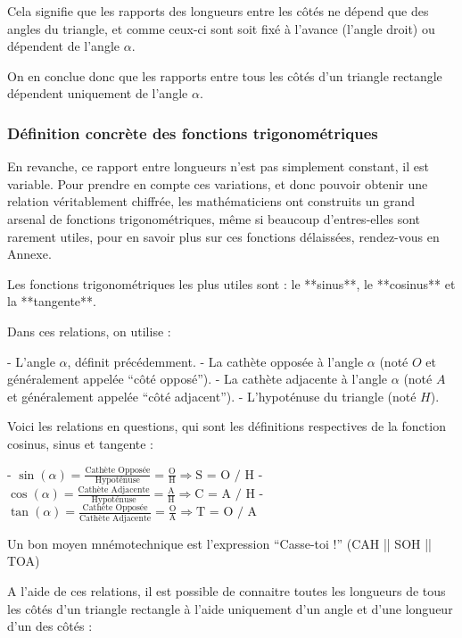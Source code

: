\documentclass[a4paper]{article}
\begin{document}
			Cela signifie que les rapports des longueurs entre les côtés ne dépend que des angles du triangle, et comme ceux-ci sont soit fixé à l'avance (l'angle droit) ou dépendent de l'angle $\alpha$. 

			On en conclue donc que les rapports entre tous les côtés d'un triangle rectangle dépendent uniquement de l'angle $\alpha$.

		\subsubsection{Définition concrète des fonctions trigonométriques}

			En revanche, ce rapport entre longueurs n'est pas simplement constant, il est variable. Pour prendre en compte ces variations, et donc pouvoir obtenir une relation véritablement chiffrée, les mathématiciens ont construits un grand arsenal de fonctions trigonométriques, même si beaucoup d'entres-elles sont rarement utiles, pour en savoir plus sur ces fonctions délaissées, rendez-vous en Annexe.

			Les fonctions trigonométriques les plus utiles sont : le **sinus**, le **cosinus** et la **tangente**.

			Dans ces relations, on utilise : 

			- L'angle $\alpha$, définit précédemment.
			- La cathète opposée à l'angle $\alpha$ (noté $O$ et généralement appelée “côté opposé”).
			- La cathète adjacente à l'angle $\alpha$ (noté $A$ et généralement appelée “côté adjacent”).
			- L'hypoténuse du triangle (noté $H$).

			Voici les relations en questions, qui sont les définitions respectives de la fonction cosinus, sinus et tangente :

			- $\sin(\alpha) = \frac{\text{Cathète Opposée}}{\text{Hypoténuse}} = \frac{\text{O}}{\text{H}} \Longrightarrow \text{S = O / H} $
			- $\cos(\alpha) = \frac{\text{Cathète Adjacente}}{\text{Hypoténuse}} = \frac{\text{A}}{\text{H}} \Longrightarrow \text{C = A / H} $
			- $\tan(\alpha) = \frac{\text{Cathète Opposée}}{\text{Cathète Adjacente}} = \frac{\text{O}}{\text{A}} \Longrightarrow \text{T = O / A} $

			Un bon moyen mnémotechnique est l'expression “Casse-toi !” (CAH || SOH || TOA)

			A l'aide de ces relations, il est possible de connaitre toutes les longueurs de tous les côtés d'un triangle rectangle à l'aide uniquement d'un angle et d'une longueur d'un des côtés : 
\end{document}
